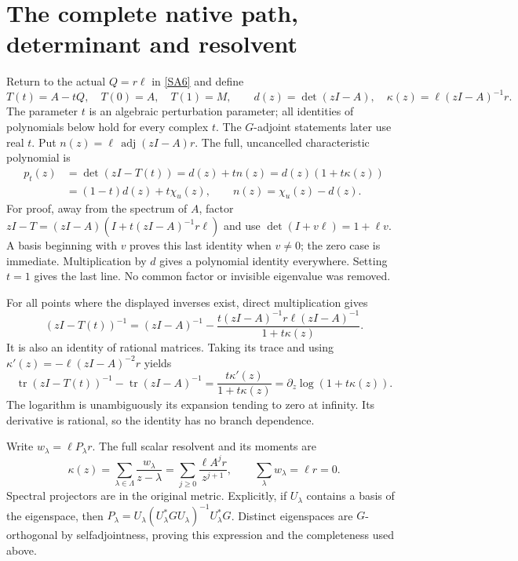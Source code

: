 \documentclass[11pt]{article}
\newcommand{\tr}{\operatorname{tr}}\newcommand{\Res}{\operatorname{Res}}
\begin{document}
\section{The complete native path, determinant and resolvent}

Return to the actual $Q=r\ell$ in \eqref{SA6} and define
\begin{equation}\tag{SA12}\label{SA12}
T(t)=A-tQ,\quad T(0)=A,\quad T(1)=M,\qquad
d(z)=\det(zI-A),\quad
\kappa(z)=\ell(zI-A)^{-1}r.
\end{equation}
The parameter $t$ is an algebraic perturbation parameter;
all identities of polynomials below hold for every complex
$t$. The $G$-adjoint statements later use real $t$.
Put $n(z)=\ell\,\operatorname{adj}(zI-A)r$.
The full, uncancelled characteristic polynomial is
\begin{equation}\tag{SA13}\label{SA13}
\begin{split}
p_t(z)&=\det(zI-T(t))=d(z)+t n(z)
       =d(z)(1+t\kappa(z))\\
      &=(1-t)d(z)+t\chi_u(z),\qquad
n(z)=\chi_u(z)-d(z).
\end{split}
\end{equation}
For proof, away from the spectrum of $A$, factor
$zI-T=(zI-A)(I+t(zI-A)^{-1}r\ell)$ and use
$\det(I+v\ell)=1+\ell v$. A basis beginning with $v$
proves this last identity when $v\ne0$; the zero case is
immediate. Multiplication by $d$ gives a polynomial
identity everywhere. Setting $t=1$ gives the last line.
No common factor or invisible eigenvalue was removed.

For all points where the displayed inverses exist, direct
multiplication gives
\begin{equation}\tag{SA14}\label{SA14}
(zI-T(t))^{-1}
=(zI-A)^{-1}
-\frac{t(zI-A)^{-1}r\ell(zI-A)^{-1}}
       {1+t\kappa(z)}.
\end{equation}
It is also an identity of rational matrices.
Taking its trace and using
$\kappa'(z)=-\ell(zI-A)^{-2}r$ yields
\begin{equation}\tag{SA15}\label{SA15}
\tr(zI-T(t))^{-1}-\tr(zI-A)^{-1}
=\frac{t\kappa'(z)}{1+t\kappa(z)}
=\partial_z\log(1+t\kappa(z)).
\end{equation}
The logarithm is unambiguously its expansion tending to
zero at infinity. Its derivative is rational, so the
identity has no branch dependence.

Write $w_\lambda=\ell P_\lambda r$. The full scalar
resolvent and its moments are
\begin{equation}\tag{SA16}\label{SA16}
\kappa(z)=\sum_{\lambda\in\Lambda}
\frac{w_\lambda}{z-\lambda}
=\sum_{j\geq0}\frac{\ell A^jr}{z^{j+1}},
\qquad \sum_\lambda w_\lambda=\ell r=0.
\end{equation}
Spectral projectors are in the original metric. Explicitly,
if $U_\lambda$ contains a basis of the eigenspace, then
$P_\lambda=U_\lambda(U_\lambda^*GU_\lambda)^{-1}
U_\lambda^*G$. Distinct eigenspaces are $G$-orthogonal
by selfadjointness, proving this expression and the
completeness used above.
\end{document}
